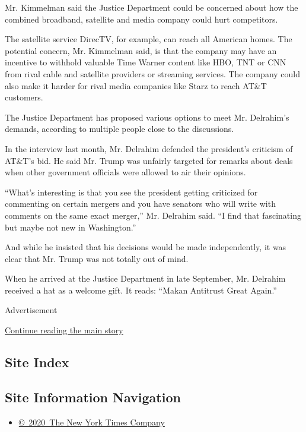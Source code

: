 Mr. Kimmelman said the Justice Department could be concerned about how
the combined broadband, satellite and media company could hurt
competitors.

The satellite service DirecTV, for example, can reach all American
homes. The potential concern, Mr. Kimmelman said, is that the company
may have an incentive to withhold valuable Time Warner content like HBO,
TNT or CNN from rival cable and satellite providers or streaming
services. The company could also make it harder for rival media
companies like Starz to reach AT\&T customers.

The Justice Department has proposed various options to meet Mr.
Delrahim's demands, according to multiple people close to the
discussions.

In the interview last month, Mr. Delrahim defended the president's
criticism of AT\&T's bid. He said Mr. Trump was unfairly targeted for
remarks about deals when other government officials were allowed to air
their opinions.

``What's interesting is that you see the president getting criticized
for commenting on certain mergers and you have senators who will write
with comments on the same exact merger,'' Mr. Delrahim said. ``I find
that fascinating but maybe not new in Washington.''

And while he insisted that his decisions would be made independently, it
was clear that Mr. Trump was not totally out of mind.

When he arrived at the Justice Department in late September, Mr.
Delrahim received a hat as a welcome gift. It reads: ``Makan Antitrust
Great Again.''

Advertisement

\protect\hyperlink{after-bottom}{Continue reading the main story}

\hypertarget{site-index}{%
\subsection{Site Index}\label{site-index}}

\hypertarget{site-information-navigation}{%
\subsection{Site Information
Navigation}\label{site-information-navigation}}

\begin{itemize}
\tightlist
\item
  \href{https://help.nytimes3xbfgragh.onion/hc/en-us/articles/115014792127-Copyright-notice}{©~2020~The
  New York Times Company}
\end{itemize}

